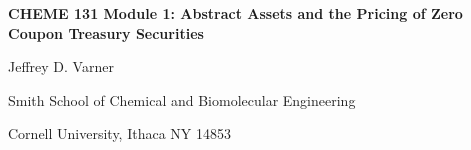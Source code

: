 \documentclass[11pt]{article}
\makeatletter
\theoremstyle{definition}
\renewcommand\subsection{\@startsection
	{subsection}{2}{0mm}
	{-0.05in}
	{-0.5\baselineskip}
	{\normalfont\normalsize\bfseries}}
\makeatother
\begin{document}
{\par\centering\textbf{\Large CHEME 131 Module 1: Abstract Assets and the Pricing of Zero Coupon Treasury Securities}}
\vspace{0.2in}
{\par \centering \large{Jeffrey D. Varner}}
\vspace{0.05in}
{\par \centering \large{Smith School of Chemical and Biomolecular Engineering}}
{\par \centering \large{Cornell University, Ithaca NY 14853}}

\date{}
\thispagestyle{empty}

\setcounter{page}{1}



\end{document}
